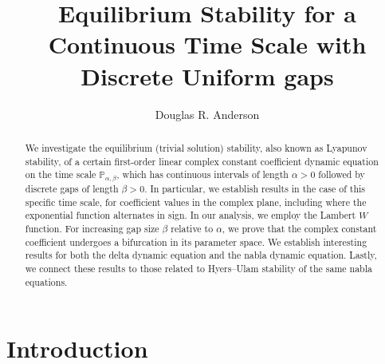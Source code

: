\documentclass[12pt,reqno]{amsart}
\theoremstyle{plain}
\theoremstyle{definition}
\newcommand{\p}{\ensuremath{\mathbb{P}}}
\numberwithin{equation}{section}
\numberwithin{theorem}{section}
\begin{document}
\title{Equilibrium Stability for a Continuous Time Scale with Discrete Uniform gaps}
\author[Anderson]{Douglas R. Anderson} 
\address{Department of Mathematics \\
         Concordia College \\
         Moorhead, MN 56562 USA \\  https://orcid.org/0000-0002-3069-2816}


\begin{abstract} 
We investigate the equilibrium (trivial solution) stability, also known as Lyapunov stability, of a certain first-order linear complex constant coefficient dynamic equation on the time scale $\p_{\alpha,\beta}$, which has continuous intervals of length $\alpha>0$ followed by discrete gaps of length $\beta>0$. In particular, we establish results in the case of this specific time scale, for coefficient values in the complex plane, including where the exponential function alternates in sign. In our analysis, we employ the Lambert $W$ function. For increasing gap size $\beta$ relative to $\alpha$, we prove that the complex constant coefficient undergoes a bifurcation in its parameter space. We establish interesting results for both the delta dynamic equation and the nabla dynamic equation. Lastly, we connect these results to those related to Hyers--Ulam stability of the same nabla equations.
\end{abstract}



\maketitle
\thispagestyle{empty}


\section{Introduction}
\end{document}
